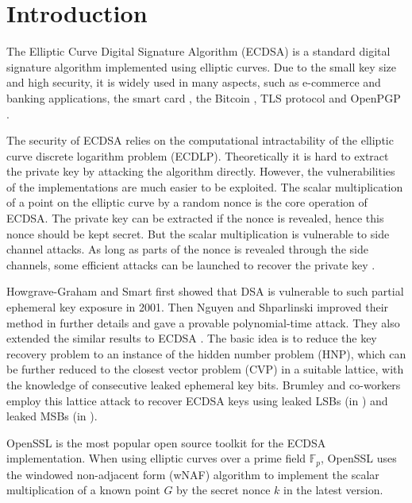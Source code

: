 \section{Introduction}
\label{sec:intro}
The Elliptic Curve Digital Signature Algorithm (ECDSA) \cite{Johnson2001, ansi2005} is a standard digital signature algorithm implemented using elliptic curves.
Due to the small key size and high security, it is widely used in many aspects, such as e-commerce and banking applications, the smart card \cite{smartcard2007}, the Bitcoin \cite{bitcoin2008}, TLS protocol \cite{rfc5246} and OpenPGP \cite{openpgp2007}.

The security of ECDSA relies on the computational intractability of the elliptic curve discrete logarithm problem (ECDLP).
Theoretically it is hard to extract the private key by attacking the algorithm directly.
However, the vulnerabilities of the implementations are much easier to be exploited.
The scalar multiplication of a point on the elliptic curve by a random nonce is the core operation of ECDSA.
The private key can be extracted if the nonce is revealed,
hence this nonce should be kept secret.
But the scalar multiplication is vulnerable to side channel attacks.
As long as parts of the nonce is revealed through the side channels,
 some efficient attacks can be launched to recover the private key \cite{Nguyen2001,HG2001,Nguyen2002,Nguyen2003}.

Howgrave-Graham and Smart \cite{HG2001} first showed that DSA is vulnerable to such partial ephemeral key exposure in 2001.
Then Nguyen and Shparlinski \cite{Nguyen2002} improved their method in further details and gave a provable polynomial-time attack.
They also extended the similar results to ECDSA \cite{Nguyen2003}.
The basic idea is to reduce the key recovery problem to an instance of the hidden number problem
(HNP), which can be further reduced to the closest vector problem (CVP) in a suitable lattice, with the
knowledge of consecutive leaked ephemeral key bits.
Brumley and co-workers employ this lattice attack to recover ECDSA keys using leaked LSBs (in \cite{Brumley2009}) and leaked MSBs (in \cite{Brumley2011}).



OpenSSL\cite{openssl} is the most popular open source toolkit for the ECDSA implementation.
When using elliptic curves over a prime field $\mathbb{F}_{p}$,
 OpenSSL uses the windowed non-adjacent form (wNAF) algorithm \cite{GORDON1998129,Miyaji1997,Koyama1002,Solinas2000} to implement the scalar multiplication of a known point $G$ by the secret nonce $k$
  in the latest version.

